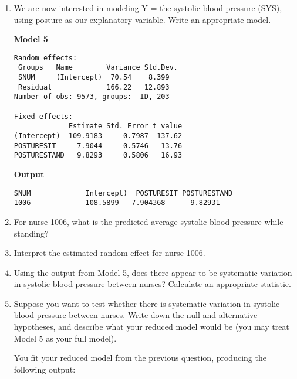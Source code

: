 \documentclass[11pt]{article}
\begin{document}
\begin{enumerate}

\item We are now interested in modeling Y = the systolic blood pressure (SYS), using posture as our explanatory variable. Write an appropriate model.

\pagebreak

\textbf{Model 5} 

\begin{verbatim}
Random effects:
 Groups   Name        Variance Std.Dev.
 SNUM     (Intercept)  70.54    8.399  
 Residual             166.22   12.893  
Number of obs: 9573, groups:  ID, 203

Fixed effects:
             Estimate Std. Error t value
(Intercept)  109.9183     0.7987  137.62
POSTURESIT     7.9044     0.5746   13.76
POSTURESTAND   9.8293     0.5806   16.93
\end{verbatim}

\textbf{Output}

\begin{verbatim}
SNUM             Intercept)  POSTURESIT POSTURESTAND
1006             108.5899   7.904368      9.82931
\end{verbatim}

\item For nurse 1006, what is the predicted average systolic blood pressure while standing? 

\vspace{4cm}

\item Interpret the estimated random effect for nurse 1006. 

\pagebreak

\item Using the output from Model 5, does there appear to be systematic variation in systolic blood pressure between nurses? Calculate an appropriate statistic.

\vspace{4cm}

\item Suppose you want to test whether there is systematic variation in systolic blood pressure between nurses. Write down the null and alternative hypotheses, and describe what your reduced model would be (you may treat Model 5 as your full model).

\pagebreak

You fit your reduced model from the previous question, producing the following output:


\end{enumerate}
\end{document}
